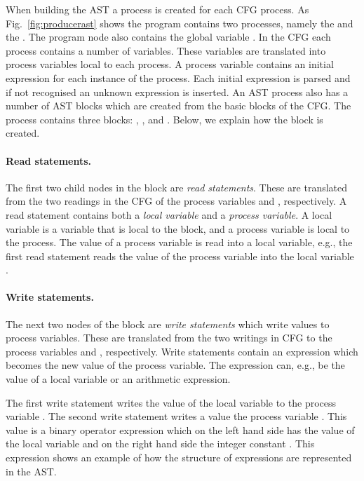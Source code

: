 When building the AST a process is created for each CFG process. As Fig.~\ref{fig:producerast} shows the program contains two processes, namely the  and the . The program node also contains the global variable . In the CFG each process contains a number of variables. These variables are translated into process variables local to each process. A process variable contains an initial expression for each instance of the process. Each initial expression is parsed and if not recognised an unknown expression is inserted. An AST process also has a number of AST blocks which are created from the basic blocks of the CFG. The  process contains three blocks: , , and . Below, we explain how the block  is created.

\paragraph*{Read statements.} The first two child nodes in the  block are \emph{read statements}. These are translated from the two readings in the CFG of the process variables  and , respectively. A read statement contains both a \emph{local variable} and a \emph{process variable}. A local variable is a variable that is local to the block, and a process variable is local to the process. The value of a process variable is read into a local variable, e.g., the first read statement reads the value of the process variable  into the local variable .

\paragraph*{Write statements.} The next two nodes of the block are \emph{write statements} which write values to process variables. These are translated from the two writings in CFG to the process variables  and , respectively. Write statements contain an expression which becomes the new value of the process variable. The expression can, e.g., be the value of a local variable or an arithmetic expression.

The first write statement writes the value of the local variable  to the process variable . The second write statement writes a value the process variable . This value is a binary operator expression which on the left hand side has the value of the local variable  and on the right hand side the integer constant . This expression shows an example of how the structure of expressions are represented in the AST.

